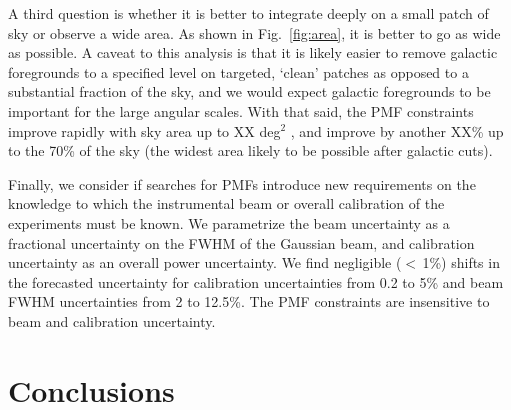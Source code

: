 \documentclass[preprint]{emulateapj}
\newcommand{\sqdeg}{deg$^2$ }
\begin{document}
A third question is whether it is better to integrate deeply on a small patch of sky or observe a wide area. 
As shown in  Fig.~\ref{fig:area}, it is better to go as wide as possible. 
A caveat to this analysis is that it is likely easier to remove galactic foregrounds to a specified level on targeted, `clean' patches as opposed to a substantial fraction of the sky, and we would expect galactic foregrounds to be important for the large angular scales. 
With that said, the PMF constraints improve rapidly with sky area up to XX \sqdeg, and improve by another XX\% up to the 70\% of the sky (the widest area likely to be possible after galactic cuts).


Finally, we consider if searches for PMFs introduce new requirements on the knowledge to which the instrumental beam or overall calibration of the experiments must be known. 
We parametrize the beam uncertainty as a fractional uncertainty on the FWHM of the Gaussian beam, and calibration uncertainty as an overall power uncertainty. 
We find negligible ($<$\,1\%) shifts in the forecasted uncertainty for calibration uncertainties from 0.2 to 5\% and beam FWHM uncertainties from 2 to 12.5\%. 
The PMF constraints are insensitive to beam and calibration uncertainty. 

\section{Conclusions}
\label{sec:conclusions}




\end{document}
